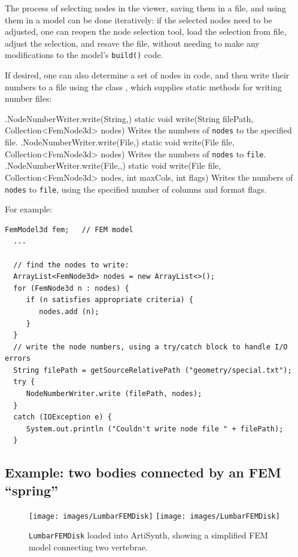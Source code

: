 The process of selecting nodes in the viewer, saving them in a file,
and using them in a model can be done iteratively: if the selected
nodes need to be adjusted, one can reopen the node selection tool, load the
selection from file, adjust the selection, and resave the file,
without needing to make any modifications to the model's {\tt build()}
code.

If desired, one can also determine a set of nodes in code, and then
write their numbers to a file using the
class , which
supplies static methods for writing number files:
%
\begin{methodtable}[4pt]{0.45}{0.55}
\midline
\methodentry
{\fem.NodeNumberWriter.write(String,)}%
{static void write(\brh String filePath, Collection<FemNode3d> nodes)}%
{Writes the numbers of {\tt nodes} to the specified file.}%
%
\methodentry
{\fem.NodeNumberWriter.write(File,)}%
{static void write(\brh File file, Collection<FemNode3d> nodes)}%
{Writes the numbers of {\tt nodes} to {\tt file}.}%
%
\methodentry
{\fem.NodeNumberWriter.write(File,,)}%
{static void write(\brh File file,
  Collection<FemNode3d> nodes, \brh int maxCols, int flags)}%
{Writes the numbers of {\tt nodes} to {\tt file}, using
the specified number of columns and format flags.}%
%
\midline
\end{methodtable}
%
For example:
%
\begin{lstlisting}[]
  FemModel3d fem;   // FEM model
  ...

  // find the nodes to write:
  ArrayList<FemNode3d> nodes = new ArrayList<>();
  for (FemNode3d n : nodes) {
     if (n satisfies appropriate criteria) {
        nodes.add (n);
     }
  }
  // write the node numbers, using a try/catch block to handle I/O errors
  String filePath = getSourceRelativePath ("geometry/special.txt");
  try {
     NodeNumberWriter.write (filePath, nodes);
  }
  catch (IOException e) {
     System.out.println ("Couldn't write node file " + filePath);
  }
\end{lstlisting}
%

\subsection{Example: two bodies connected by an FEM ``spring''}
\label{sec:fem:LumarFEMDisk}

\begin{figure}[h]
\begin{center}
\iflatexml
 \texttt{[image: images/LumbarFEMDisk]}
\else
 \texttt{[image: images/LumbarFEMDisk]}
\fi
\end{center}
\caption{{\tt LumbarFEMDisk} loaded into ArtiSynth, showing
a simplified FEM model connecting two vertebrae.}
\label{LumbarFEMDisk:fig}
\end{figure}

